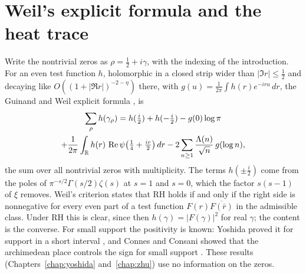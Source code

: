 \section{Weil's explicit formula and the heat trace}\label{wt:sec:explicit}

Write the nontrivial zeros as $\rho=\frac12+i\gamma$, with the indexing of the introduction. For an even test function $h$, holomorphic in a closed strip wider than $|\Im r|\le\frac12$ and decaying like $O((1+|\Re r|)^{-2-\eta})$ there, with $g(u)=\frac1{2\pi}\int h(r)e^{-iru}\,dr$, the Guinand and Weil explicit formula \cite{Guinand48,Weil52}, \cite[Theorem 5.12]{IwaniecKowalski04} is
\begin{multline}\label{wt:eq:ef}
\sum_\rho h(\gamma_\rho)=h(\tfrac i2)+h(-\tfrac i2)-g(0)\log\pi\\+\frac1{2\pi}\int_{\mathbb{R}}h(r)\,\operatorname{Re}\psi\big(\tfrac14+\tfrac{ir}2\big)\,dr-2\sum_{n\ge1}\frac{\Lambda(n)}{\sqrt n}\,g(\log n),
\end{multline}
the sum over all nontrivial zeros with multiplicity. The terms $h(\pm\frac i2)$ come from the poles of $\pi^{-s/2}\Gamma(s/2)\zeta(s)$ at $s=1$ and $s=0$, which the factor $s(s-1)$ of $\xi$ removes. Weil's criterion \cite{Weil52,Bombieri} states that RH holds if and only if the right side is nonnegative for every even part of a test function $F(r)\overline{F(\bar r)}$ in the admissible class. Under RH this is clear, since then $h(\gamma)=|F(\gamma)|^2$ for real $\gamma$; the content is the converse. For small support the positivity is known: Yoshida proved it for support in a short interval \cite{Yoshida92}, and Connes and Consani showed that the archimedean place controls the sign for small support \cite{ConnesConsani21}. %
These results (Chapters~\ref{chap:yoshida} and~\ref{chap:zhu}) use no information on the zeros.

